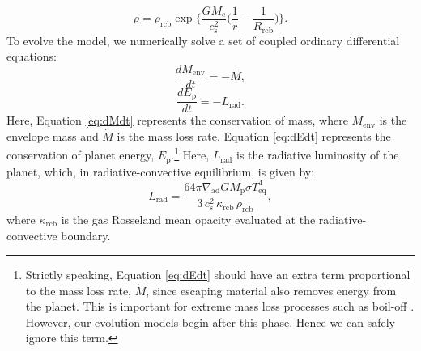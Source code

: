 \documentclass[fleqn,usenatbib]{mnras}
\begin{document}
\begin{equation} \label{eq:temperature_profile_isotherm}
    \rho = \rho_\text{rcb} \exp \bigg\{ \frac{GM_\text{c}}{c_\text{s}^2} \bigg( \frac{1}{r} - \frac{1}{R_\text{rcb}} \bigg) \bigg\}.
\end{equation}
To evolve the model, we numerically solve a set of coupled ordinary differential equations:
\begin{equation} \label{eq:dMdt}
    \frac{d M_\text{env}}{dt} = - \dot{M},
\end{equation}
\begin{equation} \label{eq:dEdt}
    \frac{d E_\text{p}}{dt} = -L_\text{rad}.
\end{equation}
Here, Equation \ref{eq:dMdt} represents the conservation of mass, where $M_\text{env}$ is the envelope mass and $\dot{M}$ is the mass loss rate. Equation \ref{eq:dEdt} represents the conservation of planet energy, $E_\text{p}$.\footnote{Strictly speaking, Equation \ref{eq:dEdt} should have an extra term proportional to the mass loss rate, $\dot{M}$, since escaping material also removes energy from the planet. This is important for extreme mass loss processes such as boil-off \citep[e.g.][]{Owen2016}. However, our evolution models begin after this phase. Hence we can safely ignore this term.} Here, $L_\text{rad}$ is the radiative luminosity of the planet, which, in radiative-convective equilibrium, is given by:
\begin{equation} \label{eq:Lrad}
    L_\text{rad} = \frac{64 \pi \nabla_\text{ad} G M_\text{p}  \sigma T_\text{eq}^4}{3 \, c_\text{s}^2 \, \kappa_\text{rcb} \, \rho_\text{rcb}},
\end{equation}
where $\kappa_\text{rcb}$ is the gas Rosseland mean opacity evaluated at the radiative-convective boundary. 
\end{document}
